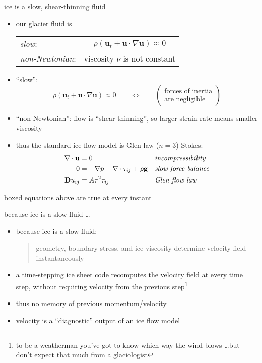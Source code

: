\documentclass[hide notes,intlimits]{beamer}
\begin{document}
\begin{frame}{ice is a slow, shear-thinning fluid}

\begin{itemize}
\item our glacier fluid is
\smallskip

  \begin{tabular}{lc}
  \emph{slow}: & $\rho \left(\mathbf{u}_t + \mathbf{u}\cdot\nabla \mathbf{u}\right) \approx 0$ \\
  \emph{non-Newtonian}: & viscosity $\nu$ is not constant
  \end{tabular}
\item ``slow'':
  $$\rho \left(\mathbf{u}_t + \mathbf{u}\cdot\nabla \mathbf{u}\right) \approx 0 \qquad \iff \qquad \begin{pmatrix} \text{forces of inertia} \\ \text{are negligible} \end{pmatrix}$$
\item ``non-Newtonian'': flow is ``shear-thinning'', so larger strain rate means smaller viscosity
\item thus the standard ice flow model is Glen-law ($n=3$) Stokes:
\begin{align*}
\nabla \cdot \mathbf{u} &= 0 &&\text{\emph{incompressibility}} \\
0 &= - \nabla p + \nabla \cdot \tau_{ij} + \rho \mathbf{g} &&\text{\emph{slow force balance}} \\
\mathbf{D}u_{ij} &= A \tau^2 \tau_{ij} &&\text{\emph{Glen flow law}}
\end{align*}
\end{itemize}

\bigskip
\begin{beamercolorbox}[shadow=true,rounded=true]{boxed} \centering\small
    equations above are true at every instant
\end{beamercolorbox}
\end{frame}


\begin{frame}{because ice is a slow fluid \dots}

\begin{itemize}
\item because ice is a slow fluid:
  \begin{quote}
  \alert{geometry, boundary stress, and ice viscosity determine velocity field instantaneously}
  \end{quote}
\item a time-stepping ice sheet code recomputes the velocity field at every time step, without requiring velocity from the previous step\footnote{to be a weatherman you've got to know which way the wind blows \dots but don't expect that much from a glaciologist}
\item thus no memory of previous momentum/velocity
\item velocity is a ``diagnostic'' output of an ice flow model
\end{itemize}
\end{frame}
\end{document}
